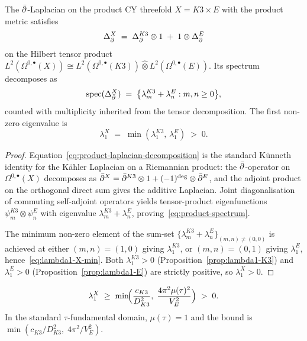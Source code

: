 \begin{theorem}
\label{thm:kunneth-spectrum-X}
\ClaimStatusTheorem{}
The $\bar\partial$-Laplacian on the product CY threefold $X = K3 \times E$
with the product metric satisfies
\begin{equation}
\label{eq:product-laplacian-decomposition}
 \Delta_{\bar\partial}^X \;=\; \Delta_{\bar\partial}^{K3} \otimes 1 \;+\; 1 \otimes \Delta_{\bar\partial}^E
\end{equation}
on the Hilbert tensor product
$L^2(\Omega^{0,\bullet}(X)) \cong L^2(\Omega^{0,\bullet}(K3))
\widehat\otimes L^2(\Omega^{0,\bullet}(E))$. Its spectrum decomposes as
\begin{equation}
\label{eq:product-spectrum}
 \mathrm{spec}(\Delta_{\bar\partial}^X) \;=\; \bigl\{ \lambda_m^{K3} + \lambda_n^E : m, n \geq 0 \bigr\},
\end{equation}
counted with multiplicity inherited from the tensor decomposition.
The first non-zero eigenvalue is
\begin{equation}
\label{eq:lambda1-X-min}
 \lambda_1^X \;=\; \min(\lambda_1^{K3},\, \lambda_1^E) \;>\; 0.
\end{equation}
\end{theorem}

\begin{proof}
Equation~\eqref{eq:product-laplacian-decomposition} is the standard
K\"unneth identity for the K\"ahler Laplacian on a Riemannian product:
the $\bar\partial$-operator on $\Omega^{0,\bullet}(X)$ decomposes as
$\bar\partial^X = \bar\partial^{K3} \otimes 1 + (-1)^{\deg} \otimes \bar\partial^E$, and the
adjoint product on the orthogonal direct sum gives the additive
Laplacian. Joint diagonalisation of commuting self-adjoint operators
yields tensor-product eigenfunctions
$\psi_m^{K3} \otimes \psi_n^E$ with eigenvalue
$\lambda_m^{K3} + \lambda_n^E$, proving~\eqref{eq:product-spectrum}.

The minimum non-zero element of the sum-set
$\{\lambda_m^{K3} + \lambda_n^E\}_{(m,n) \neq (0,0)}$ is achieved at
either $(m,n) = (1,0)$ giving $\lambda_1^{K3}$, or $(m,n) = (0,1)$
giving $\lambda_1^E$, hence~\eqref{eq:lambda1-X-min}. Both
$\lambda_1^{K3} > 0$ \textup{(Proposition~\ref{prop:lambda1-K3})} and
$\lambda_1^E > 0$ \textup{(Proposition~\ref{prop:lambda1-E})} are
strictly positive, so $\lambda_1^X > 0$.
\end{proof}

\begin{corollary}
\label{cor:quantitative-gap}
\ClaimStatusCorollary{}
\begin{equation}
\label{eq:quantitative-gap}
 \lambda_1^X \;\geq\; \min\!\Bigl( \frac{c_{K3}}{D_{K3}^2},\; \frac{4\pi^2 \mu(\tau)^2}{V_E^2} \Bigr) \;>\; 0.
\end{equation}
In the standard $\tau$-fundamental domain, $\mu(\tau) = 1$ and the
bound is $\min(c_{K3}/D_{K3}^2,\; 4\pi^2 / V_E^2)$.
\end{corollary}

